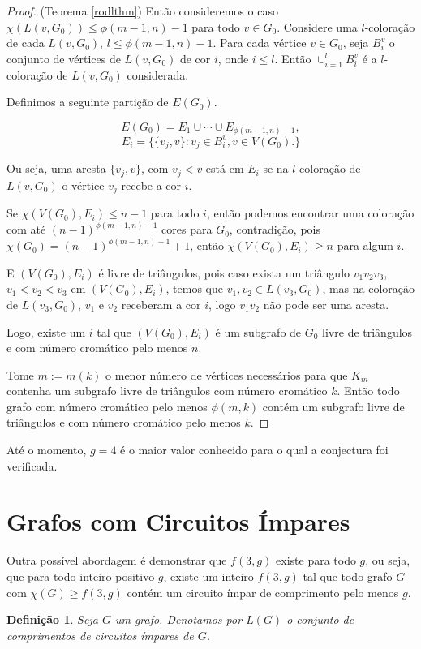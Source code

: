 \documentclass{article}
\newtheorem{definicao}{Definição}[section]
\begin{document}
\begin{proof}{(Teorema \ref{rodlthm})}
Então consideremos o caso $\chi(L(v,G_0)) \leq \phi(m-1,n)-1$ para todo $v\in G_0$. Considere uma $l$-coloração de cada $L(v,G_0)$, $l\leq \phi(m-1,n)-1$. Para cada vértice $v\in G_0$, seja $B_i^v$ o conjunto de vértices de $L(v,G_0)$ de cor $i$, onde $i\leq l$. Então $\cup_{i=1}^l B_i^v$ é a $l$-coloração de $L(v,G_0)$ considerada.

Definimos a seguinte partição de $E(G_0)$.

\[E(G_0) = E_1 \cup \cdots \cup E_{\phi(m-1,n)-1},\]
\[E_i = \{\{v_j,v\} : v_j \in B_i^v, v\in V(G_0).\}\]

Ou seja, uma aresta $\{v_j,v\}$, com $v_j < v$ está em $E_i$ se na $l$-coloração de $L(v,G_0)$ o vértice $v_j$ recebe a cor $i$.

Se $\chi(V(G_0),E_i) \leq n-1$ para todo $i$, então podemos encontrar uma coloração com até $(n-1)^{\phi(m-1,n)-1}$ cores para $G_0$, contradição, pois $\chi(G_0) = (n-1)^{\phi(m-1,n)-1}+1$, então $\chi(V(G_0),E_i)\geq n$ para algum $i$.

E $(V(G_0),E_i)$ é livre de triângulos, pois caso exista um triângulo $v_1v_2v_3$, $v_1 < v_2 < v_3$ em $(V(G_0),E_i)$, temos que $v_1,v_2 \in L(v_3, G_0)$, mas na coloração de $L(v_3, G_0)$, $v_1$ e $v_2$ receberam a cor $i$, logo $v_1v_2$ não pode ser uma aresta.

Logo, existe um $i$ tal que $(V(G_0),E_i)$ é um subgrafo de $G_0$ livre de triângulos e com número cromático pelo menos $n$.

Tome $m := m(k)$ o menor número de vértices necessários para que $K_m$ contenha um subgrafo livre de triângulos com número cromático $k$. Então todo grafo com número cromático pelo menos $\phi(m, k)$ contém um subgrafo livre de triângulos e com número cromático pelo menos $k$.
\end{proof}

Até o momento, $g=4$ é o maior valor conhecido para o qual a conjectura foi verificada.

\section{Grafos com Circuitos Ímpares}
Outra possível abordagem é demonstrar que $f(3,g)$ existe para todo $g$, ou seja, que para todo inteiro positivo $g$, existe um inteiro $f(3,g)$ tal que todo grafo $G$ com $\chi(G)\geq f(3,g)$ contém um circuito ímpar de comprimento pelo menos $g$.

\begin{definicao}
Seja $G$ um grafo. Denotamos por $L(G)$ o conjunto de comprimentos de circuitos ímpares de $G$.
\end{definicao}
\end{document}
